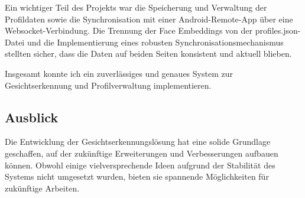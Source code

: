 Ein wichtiger Teil des Projekts war die Speicherung und Verwaltung der Profildaten sowie die Synchronisation mit einer Android-Remote-App über eine Websocket-Verbindung. Die Trennung der Face Embeddings von der profiles.json-Datei und die Implementierung eines robusten Synchronisationsmechanismus stellten sicher, dass die Daten auf beiden Seiten konsistent und aktuell blieben.

Insgesamt konnte ich ein zuverlässiges und genaues System zur Gesichtserkennung und Profilverwaltung implementieren.


\subsection{Ausblick}
Die Entwicklung der Gesichtserkennungslösung hat eine solide Grundlage geschaffen, auf der zukünftige Erweiterungen und Verbesserungen aufbauen können. Obwohl einige vielversprechende Ideen aufgrund der  Stabilität des Systems nicht umgesetzt wurden, bieten sie spannende Möglichkeiten für zukünftige Arbeiten.

